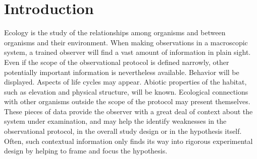 \section{Introduction}

Ecology is the study of the relationships among organisms and between organisms and their environment. When making observations in a macroscopic system, a trained observer will find a vast amount of information in plain sight. Even if the scope of the observational protocol is defined narrowly, other potentially important information is nevertheless available. Behavior will be displayed. Aspects of life cycles may appear. Abiotic properties of the habitat, such as elevation and physical structure, will be known. Ecological connections with other organisms outside the scope of the protocol may present themselves. These pieces of data provide the observer with a great deal of context about the system under examination, and may help the identify weaknesses in the observational protocol, in the overall study design or in the hypothesis itself. Often, such contextual information only finds its way into rigorous experimental design by helping to frame and focus the hypothesis. 





